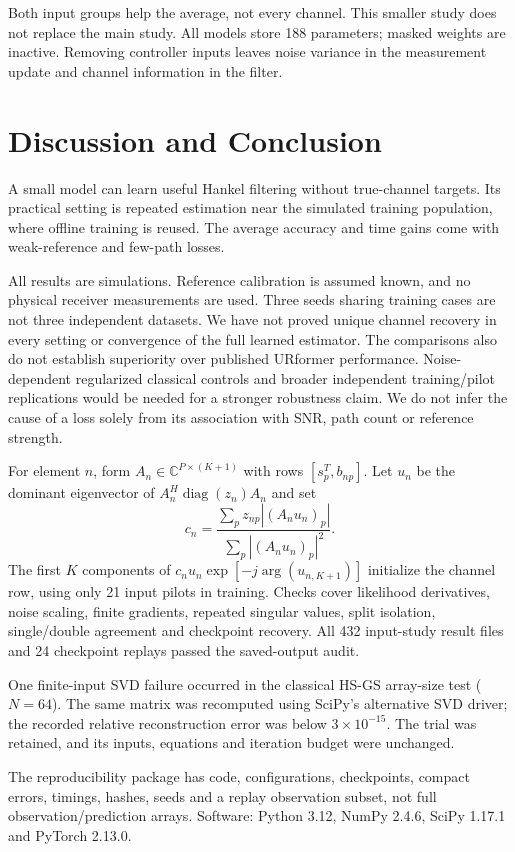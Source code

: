 \documentclass[journal]{IEEEtran}
\begin{document}
Both input groups help the average, not every channel. This smaller study
does not replace the main study. All models store 188 parameters; masked
weights are inactive. Removing controller inputs leaves noise variance in
the measurement update and channel information in the filter.

\section{Discussion and Conclusion}
A small model can learn useful Hankel filtering without true-channel
targets. Its practical setting is repeated estimation near the simulated
training population, where offline training is reused. The average
accuracy and time gains come with weak-reference and few-path losses.

All results are simulations. Reference calibration is assumed known,
and no physical receiver measurements are used. Three seeds sharing
training cases are not three independent datasets. We have not proved
unique channel recovery in every setting or convergence of the full
learned estimator. The comparisons also do not establish superiority
over published URformer performance.
Noise-dependent regularized classical controls and broader independent
training/pilot replications would be needed for a stronger robustness
claim. We do not infer the cause of a loss solely from its association
with SNR, path count or reference strength.

For element $n$, form $A_n\in\mathbb C^{P\times(K+1)}$ with rows
$[s_p^T,b_{np}]$. Let $u_n$ be the dominant eigenvector of
$A_n^H\operatorname{diag}(z_n)A_n$ and set
\begin{equation}
 c_n=\frac{\sum_p z_{np}|(A_nu_n)_p|}{\sum_p|(A_nu_n)_p|^2}.
\end{equation}
The first $K$ components of $c_nu_n\exp[-j\arg(u_{n,K+1})]$ initialize
the channel row, using only 21 input pilots in training.
Checks cover likelihood derivatives, noise scaling, finite gradients,
repeated singular values, split isolation, single/double agreement and
checkpoint recovery. All 432 input-study result files and 24 checkpoint
replays passed the saved-output audit.

One finite-input SVD failure occurred in the classical HS-GS array-size
test ($N=64$). The same matrix was recomputed using SciPy's alternative
SVD driver; the recorded relative reconstruction error was below
$3\times10^{-15}$. The trial was retained, and its inputs, equations and
iteration budget were unchanged.

The reproducibility package has code, configurations, checkpoints, compact
errors, timings, hashes, seeds and a replay observation subset, not full
observation/prediction arrays. Software: Python 3.12, NumPy 2.4.6,
SciPy 1.17.1 and PyTorch 2.13.0.


\end{document}
